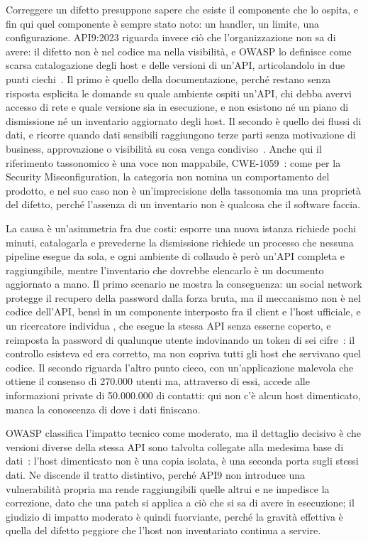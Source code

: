 Correggere un difetto presuppone sapere che esiste il componente che lo
ospita, e fin qui quel componente è sempre stato noto: un handler, un limite,
una configurazione. API9:2023 riguarda invece ciò che l'organizzazione non sa
di avere: il difetto non è nel codice ma
nella visibilità, e OWASP lo definisce come scarsa catalogazione degli host e
delle versioni di un'API, articolandolo in due punti
ciechi~\cite{owasp2023api9}. Il primo è quello della documentazione, perché
restano senza risposta esplicita le domande su quale ambiente ospiti un'API,
chi debba avervi accesso di rete e quale versione sia in esecuzione, e non
esistono né un piano di dismissione né un inventario aggiornato degli host. Il
secondo è quello dei flussi di dati, e ricorre quando dati sensibili
raggiungono terze parti senza motivazione di business, approvazione o
visibilità su cosa venga condiviso~\cite{owasp2023api9}. Anche qui il
riferimento tassonomico è una voce non mappabile, CWE-1059~\cite{cwe1059}: come
per la Security Misconfiguration, la categoria non nomina un comportamento del prodotto, e nel suo caso
non è un'imprecisione della tassonomia ma una proprietà del difetto, perché
l'assenza di un inventario non è qualcosa che il software faccia.

La causa è un'asimmetria fra due costi: esporre una nuova istanza richiede
pochi minuti, catalogarla e prevederne la dismissione richiede un processo che
nessuna pipeline esegue da sola, e ogni ambiente di collaudo è però un'API
completa e raggiungibile, mentre l'inventario che dovrebbe elencarlo è un
documento aggiornato a mano. Il primo scenario ne mostra la conseguenza: un
social network protegge il recupero della password dalla forza bruta, ma il
meccanismo non è nel codice dell'API, bensì in un componente interposto fra il
client e l'host ufficiale, e un ricercatore individua
, che esegue la stessa API senza esserne
coperto, e reimposta la password di qualunque utente indovinando un token di
sei cifre~\cite{owasp2023api9}: il controllo esisteva ed era corretto, ma non
copriva tutti gli host che servivano quel codice. Il secondo riguarda l'altro
punto cieco, con un'applicazione malevola che ottiene il consenso di 270.000
utenti ma, attraverso di essi, accede alle informazioni private di 50.000.000
di contatti: qui non c'è alcun host dimenticato, manca la conoscenza di dove i
dati finiscano.

OWASP classifica l'impatto tecnico come moderato, ma il dettaglio decisivo è
che versioni diverse della stessa API sono talvolta collegate alla medesima
base di dati~\cite{owasp2023api9}: l'host dimenticato non è una copia isolata,
è una seconda porta sugli stessi dati. Ne discende il tratto distintivo, perché
API9 non introduce una vulnerabilità propria ma rende raggiungibili quelle
altrui e ne impedisce la correzione, dato che una patch si applica a ciò che si
sa di avere in esecuzione; il giudizio di impatto moderato è quindi fuorviante,
perché la gravità effettiva è quella del difetto peggiore che l'host non
inventariato continua a servire.

